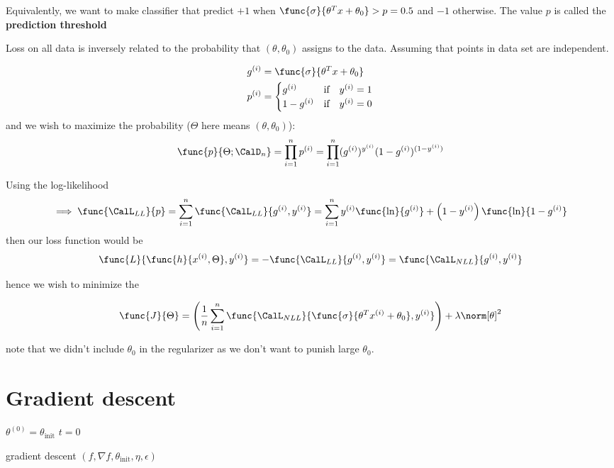 Equivalently, we want to make classifier that predict \(+1\) when \(\func{\sigma}{\theta^T x+ \theta_0} > p = 0.5\) and \(-1\) otherwise. The value \(p\) is called the \textbf{prediction threshold}

Loss on all data is inversely related to the probability that \((\theta , \theta_0)\) assigns to the data. Assuming that points in data set are independent.

\begin{align*}
    g^{(i)} & =  \func{\sigma}{\theta^T x + \theta_0} \\
    p^{(i)} & = \begin{cases}
        g^{(i)}     & \text{if} \quad y^{(i)} = 1 \\
        1 - g^{(i)} & \text{if} \quad y^{(i)} = 0 \\
    \end{cases}
\end{align*}
and we wish to maximize the probability (\(\Theta\) here means \((\theta, \theta_0)\)):
\begin{equation*}
    \func{p}{\Theta ; \CalD_n} = \prod_{i = 1}^n p^{(i)} = \prod_{i = 1}^n (g^{(i)})^{y^{(i)}} ( 1 - g^{(i)})^{(1 - y^{(i)})}                   \\
\end{equation*}

Using the log-likelihood
\begin{equation*}
    \implies \func{\CalL_{LL}}{p} = \sum_{i = 1}^n \func{\CalL_{LL}}{g^{(i)} , y^{(i)}} =\sum_{i = 1}^n  y^{(i)} \func{\ln}{g^{(i)}} + \left(1 - y^{(i)} \right) \func{\ln}{ 1 - g^{(i)}} 
\end{equation*}
then our loss function would be
\begin{equation*}
    \func{L}{\func{h}{x^{(i)}, \Theta} , y^{(i)}} = - \func{\CalL_{LL}}{g^{(i)} , y^{(i)}} =\func{\CalL_{NLL}}{g^{(i)} , y^{(i)}} 
\end{equation*}

hence we wish to minimize the 

\begin{equation*}
    \func{J}{\Theta}  = \left(\dfrac{1}{n} \sum_{i = 1}^n \func{\CalL_{NLL}}{ \func{\sigma}{\theta^T x^{(i)} + \theta_0} , y^{(i)}} \right) + \lambda \norm[\theta]^2
\end{equation*}

note that we didn't include \(\theta_0\) in the regularizer as we don't want to punish large \(\theta_0\). 

\section{Gradient descent}
\begin{algorithm}[H]
    \DontPrintSemicolon
    $\theta^{(0)} = \theta_{\mathrm{init}} $\;
    $t = 0 $\;


    \Return{$\theta $}
    \caption{ gradient descent $(f, \nabla f, \theta_{\mathrm{init}} , \eta , \epsilon )$}
\end{algorithm}

